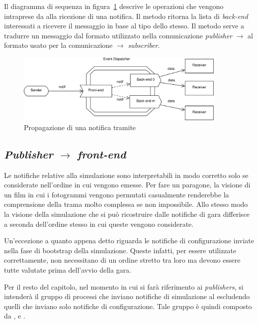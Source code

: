 Il diagramma di sequenza in figura~\ref{fig:dispatcher} descrive le operazioni che vengono intraprese da \evdisp{} alla ricezione di una notifica.
Il metodo  ritorna la lista di \textit{back-end} interessati a ricevere il messaggio  in base al tipo dello stesso.
Il metodo  serve a tradurre un messaggio dal formato utilizzato nella comunicazione \textit{publisher} $\rightarrow$ \evdisp{} al formato usato per la comunicazione \evdisp{} $\rightarrow$ \textit{subscriber}.

\begin{figure}
\includegraphics[width=0.9\textwidth]{diagrammi/Dispatcher}
\caption{Propagazione di una notifica tramite \evdisp{}}
\label{fig:dispatcher}
\end{figure}

\subsection*{\textit{Publisher} $\rightarrow$ \textit{front-end}}
Le notifiche relative alla simulazione sono interpretabili in modo corretto solo se considerate nell'ordine in cui vengono emesse.
Per fare un paragone, la visione di un film in cui i fotogrammi vengono permutati casualmente renderebbe la comprensione della trama molto complessa se non impossibile. Allo stesso modo la visione della simulazione che si può ricostruire dalle notifiche di gara differisce a seconda dell'ordine stesso in cui queste vengono considerate.

Un'eccezione a quanto appena detto riguarda le notifiche di configurazione inviate nella fase di bootstrap della simulazione. Queste infatti, per essere utilizzate correttamente, non necessitano di un ordine stretto tra loro ma devono essere tutte valutate prima dell'avvio della gara.

Per il resto del capitolo, nel momento in cui si farà riferimento ai \textit{publishers}, si intenderà il gruppo di processi che inviano notifiche di simulazione al \evdisp{} escludendo quelli che inviano solo notifiche di configurazione. Tale gruppo è quindi composto da \sched{}, \evdisp{} e \car{}.

